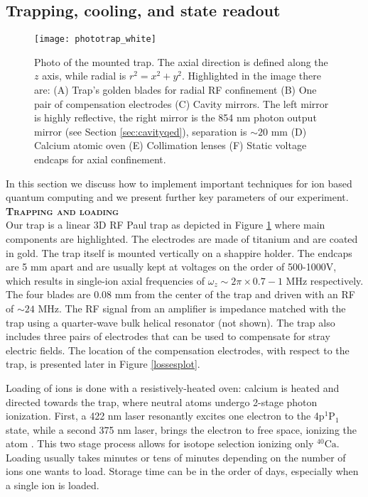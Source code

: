 \subsection{Trapping, cooling, and state readout}
\label{sec:expparameters}
\begin{figure}
\centering
\texttt{[image: phototrap\_white]}
\caption{Photo of the mounted trap. The axial direction is defined along the $z$ axis, while radial is $r^2 = x^2 + y^2$. Highlighted in the image there are: (A) Trap's golden blades for radial RF confinement (B) One pair of compensation electrodes (C) Cavity mirrors. The left mirror is highly reflective, the right mirror is the 854 nm photon output mirror (see Section \ref{sec:cavityqed}), separation is $\sim 20$ mm (D) Calcium atomic oven (E) Collimation lenses (F) Static voltage endcaps for axial confinement.}
\label{trapphoto}
\end{figure}
In this section we discuss how to implement important techniques for ion based quantum computing and we present further key parameters of our experiment.\vspace{.5em}\\
\textbf{\textsc{Trapping and loading}}\\
Our trap is a linear 3D RF Paul trap as depicted in Figure \ref{trapphoto} where main components are highlighted. The electrodes are made of titanium and are coated in gold. The trap itself is mounted vertically on a shappire holder. The endcaps are 5 mm apart and are usually kept at voltages on the order of 500-1000V, which results in single-ion axial frequencies of $\omega_z \sim 2\pi \times 0.7-1$ MHz respectively. The four blades are 0.08 mm from the center of the trap and driven with an RF of $\sim 24$ MHz. The RF signal from an amplifier is impedance matched with the trap using a quarter-wave bulk helical resonator (not shown). The trap also includes three pairs of electrodes that can be used to compensate for stray electric fields. The location of the compensation electrodes, with respect to the trap, is presented later in Figure \ref{lossesplot}.\par
Loading of ions is done with a resistively-heated oven: calcium is heated and directed towards the trap, where neutral atoms undergo 2-stage photon ionization. First, a 422 nm laser resonantly excites one electron to the 4p$^1\text{P}_1$ state, while a second 375 nm laser, brings the electron to free space, ionizing the atom \cite{Gulde2001}. This two stage process allows for isotope selection ionizing only $^{40}\text{Ca}$. Loading usually takes minutes or tens of minutes depending on the number of ions one wants to load. Storage time can be in the order of days, especially when a single ion is loaded.\vspace{.5em}\\
